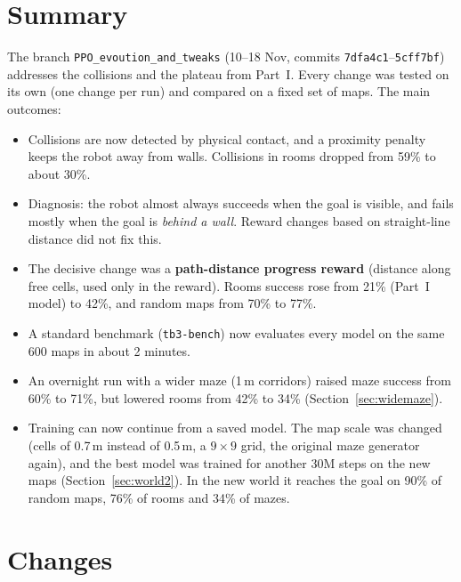 \documentclass[11pt,a4paper]{article}
\newcommand{\code}[1]{\texttt{#1}}
\begin{document}
\section{Summary}
The branch \code{PPO\_evoution\_and\_tweaks} (10--18 Nov, commits
\code{7dfa4c1}--\code{5cff7bf}) addresses the collisions and the plateau from
Part~I. Every change was tested on its own (one change per run) and compared on
a fixed set of maps. The main outcomes:
\begin{itemize}[leftmargin=*]
      \item Collisions are now detected by physical contact, and a proximity penalty keeps
            the robot away from walls. Collisions in rooms dropped from 59\% to about 30\%.
      \item Diagnosis: the robot almost always succeeds when the goal is visible, and fails
            mostly when the goal is \emph{behind a wall}. Reward changes based on
            straight-line distance did not fix this.
      \item The decisive change was a \textbf{path-distance progress reward} (distance
            along free cells, used only in the reward). Rooms success rose from 21\%
            (Part~I model) to 42\%, and random maps from 70\% to 77\%.
      \item A standard benchmark (\code{tb3-bench}) now evaluates every model on the same
            600 maps in about 2 minutes.
      \item An overnight run with a wider maze (1\,m corridors) raised maze success
            from 60\% to 71\%, but lowered rooms from 42\% to 34\%
            (Section~\ref{sec:widemaze}).
      \item Training can now continue from a saved model. The map scale was changed
            (cells of 0.7\,m instead of 0.5\,m, a $9\times9$ grid, the original maze
            generator again), and the best model was trained for another 30M steps on
            the new maps (Section~\ref{sec:world2}). In the new world it reaches the
            goal on 90\% of random maps, 76\% of rooms and 34\% of mazes.
\end{itemize}

\section{Changes}
\end{document}

